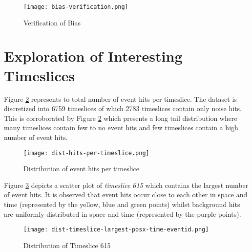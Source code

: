 \begin{figure}[h]
  \centering
  \texttt{[image: bias-verification.png]}
  \caption{Verification of Bias}%
  \label{fig:bias-verification}
\end{figure}

\section{Exploration of Interesting Timeslices}%
\label{sec:data-exp-interesting-timeslices}

Figure \ref{fig:dist-hits-per-timeslice} represents to total number of event hits per timeslice. The dataset is discretized into 6759 timeslices of which 2783 timeslices contain only noise hits. This is corroborated by Figure \ref{fig:dist-hits-per-timeslice} which presents a long tail distribution where many timeslices contain few to no event hits and few timeslices contain a high number of event hits.

\begin{figure}[h]
  \centering
  \texttt{[image: dist-hits-per-timeslice.png]}
  \caption{Distribution of event hits per timeslice}%
  \label{fig:dist-hits-per-timeslice}
\end{figure}

Figure \ref{fig:dist-timeslice-largest} depicts a scatter plot of \emph{timeslice 615} which contains the largest number of event hits. It is observed that event hits occur close to each other in space and time (represented by the yellow, blue and green points) whilst background hits are uniformly distributed in space and time (represented by the purple points).


\begin{figure}[h]
  \centering
  \texttt{[image: dist-timeslice-largest-posx-time-eventid.png]}
  \caption{Distribution of Timeslice 615}%
  \label{fig:dist-timeslice-largest}
\end{figure}


